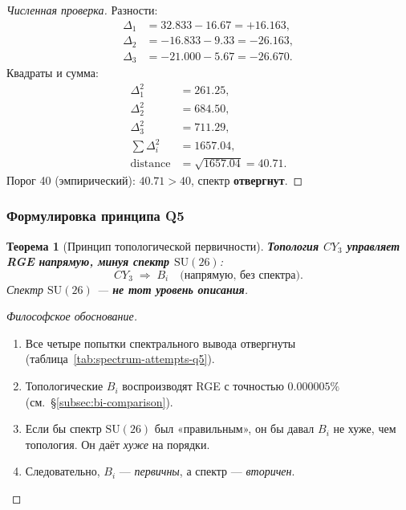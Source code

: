 \documentclass[11pt,a4paper]{article}
\newcommand{\SU}{\ensuremath{\mathrm{SU}}}
\newcommand{\CY}{\ensuremath{CY_3}}
\newtheorem{theorem}{Теорема}[section]
\theoremstyle{definition}
\begin{document}
\begin{proof}[Численная проверка]
Разности:
\begin{align}
    \Delta_1 &= 32.833 - 16.67 = +16.163, \\
    \Delta_2 &= -16.833 - 9.33 = -26.163, \\
    \Delta_3 &= -21.000 - 5.67 = -26.670.
\end{align}
Квадраты и сумма:
\begin{align}
    \Delta_1^2 &= 261.25, \\
    \Delta_2^2 &= 684.50, \\
    \Delta_3^2 &= 711.29, \\
    \sum \Delta_i^2 &= 1657.04, \\
    \text{distance} &= \sqrt{1657.04} = 40.71.
\end{align}
Порог 40 (эмпирический): $40.71 > 40$, спектр \textbf{отвергнут}.
\end{proof}

\subsubsection{Формулировка принципа Q5}

\begin{theorem}[Принцип топологической первичности]
\label{thm:topology-primary}
\textbf{Топология $\CY$ управляет RGE напрямую, минуя спектр $\SU(26)$}:
\begin{equation}
    \boxed{
    \CY \;\Rightarrow\; B_i
    \quad \text{(напрямую, без спектра)}.
    }
    \label{eq:topology-primary}
\end{equation}
Спектр $\SU(26)$ --- \textbf{не тот уровень описания}.
\end{theorem}

\begin{proof}[Философское обоснование]
\begin{enumerate}
    \item Все четыре попытки спектрального вывода отвергнуты
          (таблица~\ref{tab:spectrum-attempts-q5}).
    \item Топологические $B_i$ воспроизводят RGE с точностью
          $0.000005\%$ (см.~\S\ref{subsec:bi-comparison}).
    \item Если бы спектр $\SU(26)$ был «правильным», он бы
          давал $B_i$ не хуже, чем топология. Он даёт \emph{хуже}
          на порядки.
    \item Следовательно, $B_i$ --- \emph{первичны},
          а спектр --- \emph{вторичен}.
\end{enumerate}
\end{proof}
\end{document}
